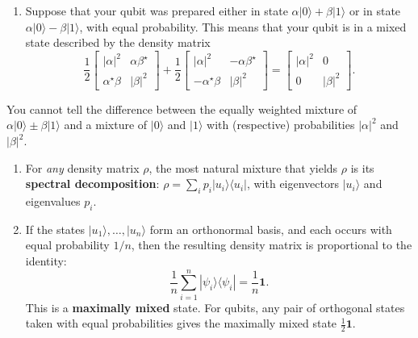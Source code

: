 \documentclass[fleqn,a4paper]{article}
\providecommand{\tightlist}{\setlength{\itemsep}{0pt}\setlength{\parskip}{0pt}}
\newenvironment{idea}{\everypar{\setlength{\parindent}{1.5em}}}{}
\theoremstyle{definition}
\theoremstyle{definition}
\theoremstyle{definition}
\theoremstyle{definition}
\theoremstyle{remark}
\begin{document}
\begin{enumerate}
\def\labelenumi{\arabic{enumi}.}
\setcounter{enumi}{2}
\tightlist
\item
  Suppose that your qubit was prepared either in state \(\alpha|0\rangle + \beta|1\rangle\) or in state \(\alpha|0\rangle - \beta|1\rangle\), with equal probability.
  This means that your qubit is in a mixed state described by the density matrix
  \[
     \frac{1}{2}
     \begin{bmatrix}
       |\alpha|^2 & \alpha\beta^\star
     \\\alpha^\star\beta & |\beta|^2
     \end{bmatrix}
     +\frac{1}{2}
     \begin{bmatrix}
       |\alpha|^2 & -\alpha\beta^\star
     \\-\alpha^\star\beta & |\beta|^2
     \end{bmatrix}
     = \begin{bmatrix}
       |\alpha|^2 & 0
     \\0 & |\beta|^2
     \end{bmatrix}.
   \]
\end{enumerate}

\begin{idea}
You cannot tell the difference between the equally weighted mixture of \(\alpha|0\rangle\pm\beta|1\rangle\) and a mixture of \(|0\rangle\) and \(|1\rangle\) with (respective) probabilities \(|\alpha|^2\) and \(|\beta|^2\).

\end{idea}

\begin{enumerate}
\def\labelenumi{\arabic{enumi}.}
\setcounter{enumi}{3}
\item
  For \emph{any} density matrix \(\rho\), the most natural mixture that yields \(\rho\) is its \textbf{spectral decomposition}: \(\rho=\sum_i p_i|u_i\rangle\langle u_i|\), with eigenvectors \(|u_i\rangle\) and eigenvalues \(p_i\).
\item
  If the states \(|u_1\rangle,\ldots,|u_n\rangle\) form an orthonormal basis, and each occurs with equal probability \(1/n\), then the resulting density matrix is proportional to the identity:
  \[
     \frac{1}{n}\sum_{i=1}^n |\psi_i\rangle\langle\psi_i|
     = \frac{1}{n}\mathbf{1}.
   \]
  This is a \textbf{maximally mixed} state.
  For qubits, any pair of orthogonal states taken with equal probabilities gives the maximally mixed state \(\frac{1}{2}\mathbf{1}\).
\end{enumerate}
\end{document}
